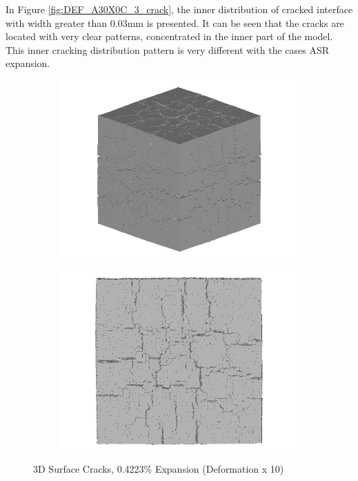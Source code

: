 In Figure \ref{fig:DEF_A30X0C_3_crack}, the inner distribution of cracked interface with width greater than 0.03mm is presented. It can be seen that the cracks are located with very clear patterns, concentrated in the inner part of the model. This inner cracking distribution pattern is very different with the cases ASR expansion.

  \begin{figure}[ht!]
  \centering
      \begin{subfigure}{.5\textwidth}
        \centering
        \includegraphics[width=.8\linewidth]{Files/exp_3D/DEF/A30X0C_3_3d.png}
      \end{subfigure}%
      \begin{subfigure}{.5\textwidth}
        \centering
        \includegraphics[width=.8\linewidth]{Files/exp_3D/DEF/A30X0C_3_3ds.png}
        \end{subfigure}
    \caption{3D Surface Cracks, 0.4223\% Expansion (Deformation x 10)}
    \label{fig:DEF_A30X0C_3_3D}
  \end{figure}

